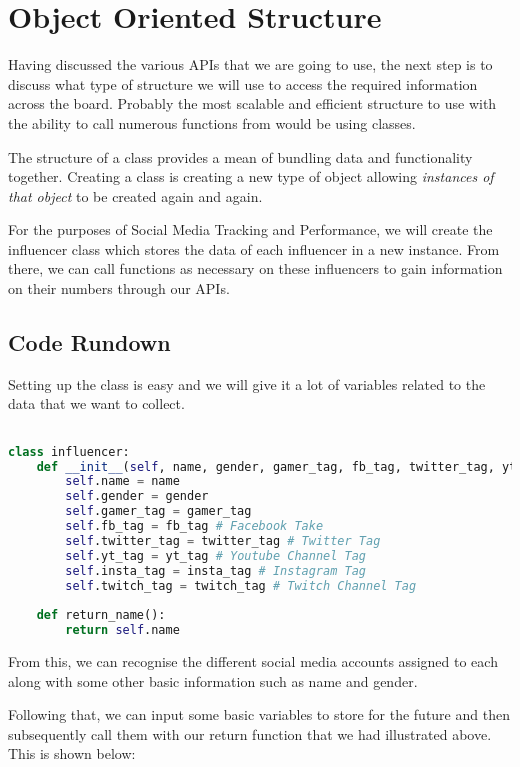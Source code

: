 \documentclass[12pt, letterpaper]{article}
\begin{document}
\section{Object Oriented Structure}
Having discussed the various APIs that we are going to use, the next step is to discuss what type of structure we will use to access the required information across the board. Probably the most scalable and efficient structure to use with the ability to call numerous functions from would be using classes.

The structure of a class provides a mean of bundling data and functionality together. Creating a class is creating a new type of object allowing \textit{instances of that object} to be created again and again.

For the purposes of Social Media Tracking and Performance, we will create the influencer class which stores the data of each influencer in a new instance. From there, we can call functions as necessary on these influencers to gain information on their numbers through our APIs.

\subsection{Code Rundown}
Setting up the class is easy and we will give it a lot of variables related to the data that we want to collect.

\begin{lstlisting}[language=python]

class influencer:
	def __init__(self, name, gender, gamer_tag, fb_tag, twitter_tag, yt_tag, insta_tag, twitch_tag):
		self.name = name
		self.gender = gender
		self.gamer_tag = gamer_tag
		self.fb_tag = fb_tag # Facebook Take
		self.twitter_tag = twitter_tag # Twitter Tag
		self.yt_tag = yt_tag # Youtube Channel Tag
		self.insta_tag = insta_tag # Instagram Tag
		self.twitch_tag = twitch_tag # Twitch Channel Tag
	
	def return_name():
		return self.name

\end{lstlisting}

From this, we can recognise the different social media accounts assigned to each along with some other basic information such as name and gender.

Following that, we can input some basic variables to store for the future and then subsequently call them with our return function that we had illustrated above. This is shown below:
\end{document}
